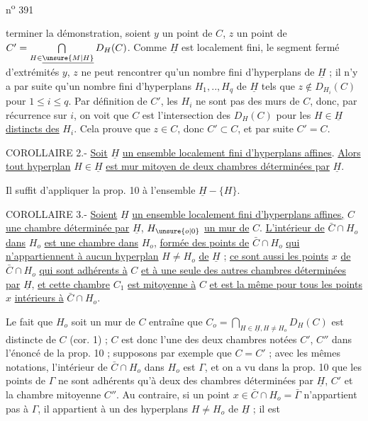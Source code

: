 n\textsuperscript{o} 391

terminer la démonstration, soient $y$ un point de $C$, $z$ un point de $C'=\bigcap\limits_{H\in\underline{\unsure{M|H}}}D_H(C)$. Comme $\underline{H}$ est localement fini, le segment fermé d'extrémités $y$, $z$ ne peut rencontrer qu'un nombre fini d'hyperplans de $\underline{H}$ ; il n'y a par suite qu'un nombre fini d'hyperplans $H_1,..,H_q$ de $\underline{H}$ tels que $z\notin D_{H_i}(C)$ pour $1\leq i\leq q$. Par définition de $C'$, les $H_i$ ne sont pas des murs de $C$, donc, par récurrence sur $i$, on voit que $C$ est l'intersection des $D_H(C)$ pour les $H\in\underline{H}$ \uline{distincts des} $H_i$. Cela prouve que $z\in C$, donc $C'\subset C$, et par suite $C'=C$.

COROLLAIRE 2.- \uline{Soit} $\underline{H}$ \uline{un ensemble localement fini d'hyperplans affines}. \uline{Alors tout hyperplan} $H\in\underline{H}$ \uline{est mur mitoyen de deux chambres déterminées par} $\underline{H}$.

Il suffit d'appliquer la prop. 10 à l'ensemble $\underline{H}-\{H\}$.

COROLLAIRE 3.- \uline{Soient} $\underline{H}$ \uline{un ensemble localement fini d'hyperplans affines,} $C$ \uline{une chambre déterminée par} $\underline{H}$, $H_{\unsure{o|0}}$ \uline{un mur de} $C$. \uline{L'intérieur de} $\bar{C}\cap H_o$ \uline{dans} $H_o$ \uline{est une chambre dans} $H_o$, \uline{formée des points de} $\bar{C}\cap H_o$ \uline{qui n'appartiennent à aucun hyperplan} $H\ne H_o$ \uline{de} $\underline{H}$ ; \uline{ce sont aussi les points} $x$ \uline{de} $\bar{C}\cap H_o$ \uline{qui sont adhérents à} $C$ \uline{et à une seule des autres chambres déterminées par} $\underline{H}$, \uline{et cette chambre} $C_1$ \uline{est mitoyenne à} $C$ \uline{et est la même pour tous les points} $x$ \uline{intérieurs à} $\bar{C}\cap H_o$.

Le fait que $H_o$ soit un mur de $C$ entraîne que $C_o=\bigcap\limits_{H\in\underline{H},H\ne H_o}D_H(C)$ est distincte de $C$ (cor. 1) ; $C$ est donc l'une des deux chambres notées $C'$, $C''$ dans l'énoncé de la prop. 10 ; supposons par exemple que $C=C'$ ; avec les mêmes notations, l'intérieur de $\bar{C}\cap H_o$ dans $H_o$ est $\Gamma$, et on a vu dans la prop. 10 que les points de $\Gamma$ ne sont adhérents qu'à deux des chambres déterminées par $\underline{H}$, $C'$ et la chambre mitoyenne $C''$. Au contraire, si un point $x\in\bar{C}\cap H_o=\bar{\Gamma}$ n'appartient pas à $\Gamma$, il appartient à un des hyperplans $H\ne H_o$ de $\underline{H}$ ; il est
